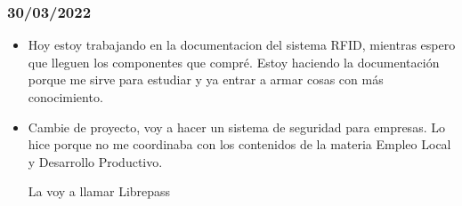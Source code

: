 \documentclass[../informe_krapp.tex]{subfiles}
\begin{document}
\subsubsection{30/03/2022}
\begin{itemize}
	\item Hoy estoy trabajando en la documentacion del sistema RFID, mientras espero
	      que lleguen los componentes que compré. Estoy haciendo la documentación porque
	      me sirve para estudiar y ya entrar a armar cosas con más conocimiento.
	\item Cambie de proyecto, voy a hacer un sistema de seguridad para empresas.
	      Lo hice porque no me coordinaba con los contenidos de la materia
	      Empleo Local y Desarrollo Productivo.

	      La voy a llamar Librepass
\end{itemize}
\end{document}
